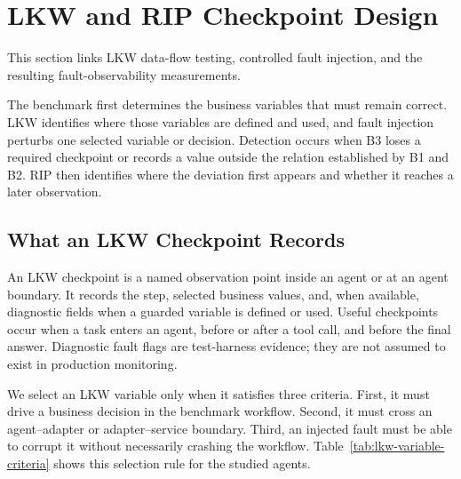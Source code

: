 \documentclass[sigconf,review,anonymous,balance=false]{acmart}
\begin{document}
\section{LKW and RIP Checkpoint Design}
\label{sec:lkw-rip}

This section links LKW data-flow testing, controlled fault injection, and the
resulting fault-observability measurements.

The benchmark first determines the business variables that must remain correct.
LKW identifies where those variables are defined and used, and fault injection
perturbs one selected variable or decision. Detection occurs when B3 loses a
required checkpoint or records a value outside the relation established by B1
and B2. RIP then identifies where the deviation first appears and whether it
reaches a later observation.

\subsection{What an LKW Checkpoint Records}

An LKW checkpoint is a named observation point inside an agent or at an agent
boundary. It records the step, selected business values, and, when available,
diagnostic fields when a guarded variable is defined or used. Useful
checkpoints occur when a task enters an agent, before or after a tool call, and
before the final answer. Diagnostic fault flags are test-harness evidence; they
are not assumed to exist in production monitoring.

We select an LKW variable only when it satisfies three criteria. First, it must
drive a business decision in the benchmark workflow. Second, it must cross an
agent--adapter or adapter--service boundary. Third, an injected fault must be
able to corrupt it without necessarily crashing the workflow. Table~\ref{tab:lkw-variable-criteria}
shows this selection rule for the studied agents.
\end{document}
